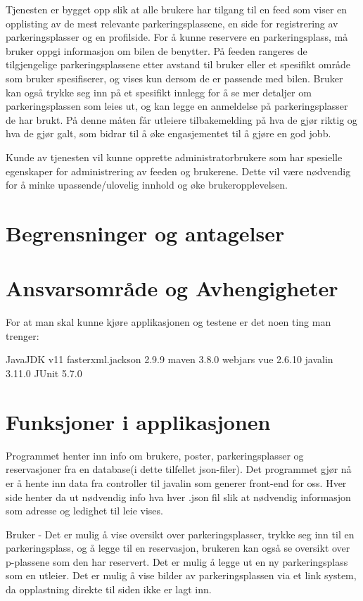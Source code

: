 \documentclass[12pt]{article}
\begin{document}
Tjenesten er bygget opp slik at alle brukere har tilgang til en feed som viser en opplisting av de mest relevante parkeringsplassene, en side for registrering av parkeringsplasser og en profilside. For å kunne reservere en parkeringsplass, må bruker oppgi informasjon om bilen de benytter. På feeden rangeres de tilgjengelige parkeringsplassene etter avstand til bruker eller et spesifikt område som bruker spesifiserer, og vises kun dersom de er passende med bilen. Bruker kan også trykke seg inn på et spesifikt innlegg for å se mer detaljer om parkeringsplassen som leies ut, og kan legge en anmeldelse på parkeringsplasser de har brukt. På denne måten får utleiere tilbakemelding på hva de gjør riktig og hva de gjør galt, som bidrar til å øke engasjementet til å gjøre en god jobb.

Kunde av tjenesten vil kunne opprette administratorbrukere som har spesielle egenskaper for administrering av feeden og brukerene. Dette vil være nødvendig for å minke upassende/ulovelig innhold og øke brukeropplevelsen.

\section{Begrensninger og antagelser}


\section{Ansvarsområde og Avhengigheter}
For at man skal kunne kjøre applikasjonen og testene er det noen ting man trenger:


JavaJDK v11
fasterxml.jackson 2.9.9
maven 3.8.0
webjars vue 2.6.10
javalin 3.11.0
JUnit 5.7.0



\section{Funksjoner i applikasjonen}

Programmet henter inn info om brukere, poster, parkeringsplasser og reservasjoner fra en database(i dette tilfellet json-filer). Det programmet gjør nå er å hente inn data fra controller til javalin som generer front-end for oss. Hver side henter da ut nødvendig info hva hver .json fil slik at nødvendig informasjon som adresse og ledighet til leie vises.

Bruker -  Det er mulig å vise oversikt over parkeringsplasser, trykke seg inn til en parkeringsplass, og å legge til en reservasjon, brukeren kan også se oversikt over p-plassene som den har reservert. Det er mulig å legge ut en ny parkeringsplass som en utleier. Det er mulig å vise bilder av parkeringsplassen via et link system, da opplastning direkte til siden ikke er lagt inn. 
\end{document}
